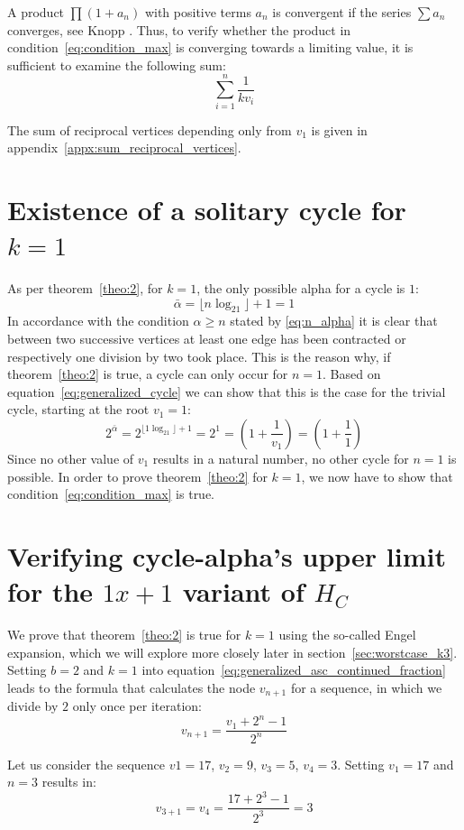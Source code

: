 A product $\prod(1+a_n)$ with positive terms $a_n$ is convergent if the series $\sum a_n$ converges, see Knopp \cite[p.~220]{Ref_Knopp}. Thus, to verify whether the product in condition~\ref{eq:condition_max} is converging towards a limiting value, it is sufficient to examine the following sum:
\begin{equation*}
\sum_{i=1}^{n}\frac{1}{kv_{i}}
\end{equation*}

The sum of reciprocal vertices depending only from $v_1$ is given in appendix~\ref{appx:sum_reciprocal_vertices}.

\section{Existence of a solitary cycle for $k=1$}
As per theorem~\ref{theo:2}, for $k=1$, the only possible alpha for a cycle is $1$:
\[
\bar\alpha=\lfloor n\log_21\rfloor+1=1
\]
In accordance with the condition $\alpha\ge n$ stated by \ref{eq:n_alpha} it is clear that between two successive vertices at least one edge has been contracted or respectively one division by two took place. This is the reason why, if theorem~\ref{theo:2} is true, a cycle can only occur for $n=1$. Based on equation~\ref{eq:generalized_cycle} we can show that this is the case for the trivial cycle, starting at the root $v_1=1$:
\[
2^{\bar\alpha}=2^{\lfloor 1\log_21\rfloor+1}=2^1=\left(1+\frac{1}{v_1}\right)=\left(1+\frac{1}{1}\right)
\]
Since no other value of $v_1$ results in a natural number, no other cycle for $n=1$ is possible. In order to prove theorem~\ref{theo:2} for $k=1$, we now have to show that condition~\ref{eq:condition_max} is true.

\section{Verifying cycle-alpha's upper limit for the $1x+1$ variant of $H_C$}
We prove that theorem~\ref{theo:2} is true for $k=1$ using the so-called Engel expansion, which we will explore more closely later in section~\ref{sec:worstcase_k3}. Setting $b=2$ and $k=1$ into equation~\ref{eq:generalized_asc_continued_fraction} leads to the formula that calculates the node $v_{n+1}$ for a sequence, in which we divide by $2$ only once per iteration:
\begin{equation}
\label{eq:appx_1}
v_{n+1}=\frac{v_1+2^n-1}{2^n}
\end{equation}

\begin{example}
	Let us consider the sequence $v1=17$, $v_2=9$, $v_3=5$, $v_4=3$. Setting $v_1=17$ and $n=3$ results in:
	\[
	v_{3+1}=v_4=\frac{17+2^3-1}{2^3}=3
	\]
\end{example}

